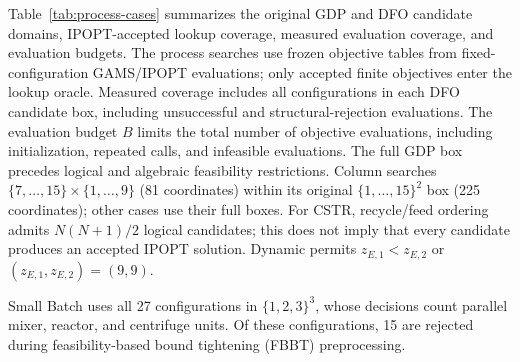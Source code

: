 \documentclass{article}
\begin{document}
Table~\ref{tab:process-cases} summarizes the original GDP and DFO candidate domains, IPOPT-accepted lookup coverage, measured evaluation coverage, and evaluation budgets.
The process searches use frozen objective tables from fixed-configuration GAMS/IPOPT evaluations; only accepted finite objectives enter the lookup oracle.
Measured coverage includes all configurations in each DFO candidate box, including unsuccessful and structural-rejection evaluations.
The evaluation budget $B$ limits the total number of objective evaluations, including initialization, repeated calls, and infeasible evaluations.
The full GDP box precedes logical and algebraic feasibility restrictions.
Column searches \(\{7,\ldots,15\}\times\{1,\ldots,9\}\) (81 coordinates) within its original \(\{1,\ldots,15\}^{2}\) box (225 coordinates); other cases use their full boxes.
For CSTR, recycle/feed ordering admits \(N(N+1)/2\) logical candidates; this does not imply that every candidate produces an accepted IPOPT solution.
Dynamic permits \(z_{E,1}<z_{E,2}\) or \((z_{E,1},z_{E,2})=(9,9)\).

Small Batch uses all 27 configurations in \(\{1,2,3\}^{3}\), whose decisions count parallel mixer, reactor, and centrifuge units.
Of these configurations, 15 are rejected during feasibility-based bound tightening (FBBT) preprocessing.
\end{document}
